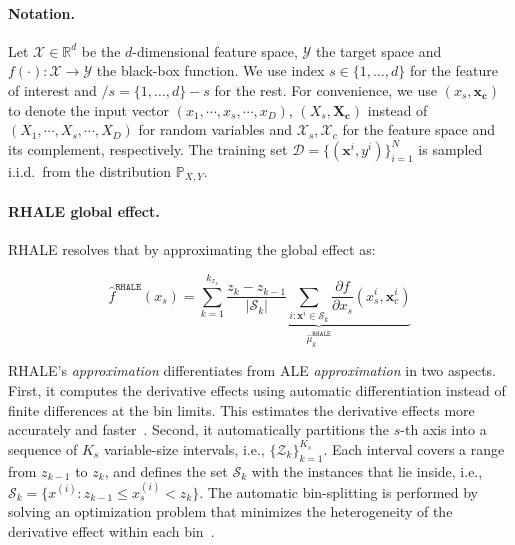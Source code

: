 \documentclass[
twocolumn,
]{ceurart}
\newcommand{\xb}{\mathbf{x}}
\newcommand{\xc}{\mathbf{x_c}}
\newcommand{\Xc}{\mathbf{X_c}}
\newcommand{\xci}{\mathbf{x}^i_c}
\begin{document}
\paragraph{Notation.}

Let \(\mathcal{X} \in \mathbb{R}^d\) be the \(d\)-dimensional feature space, \(\mathcal{Y}\) the target space and
\(f(\cdot) : \mathcal{X} \rightarrow \mathcal{Y}\) the black-box function.
We use index \(s \in \{1, \ldots, d\}\) for the feature of interest and \(/s = \{1, \ldots, d\} - s\) for the rest.
For convenience, we use \((x_s, \xc)\) to denote the input vector \((x_1, \cdots , x_s, \cdots, x_D)\),
\((X_s, \Xc)\) instead of \((X_1, \cdots , X_s, \cdots, X_D)\) for random variables and
$\mathcal{X}_s, \mathcal{X}_{c}$ for the feature space and its complement, respectively.
The training set \(\mathcal{D} = \{(\xb^i, y^i)\}_{i=1}^N\) is sampled
i.i.d.\ from the distribution \(\mathbb{P}_{X,Y}\).

\paragraph{RHALE global effect.}

RHALE resolves that by approximating the global effect as:

\begin{equation}
  \label{eq:rhale-approximation}
\hat{f}^{\mathtt{RHALE}}(x_s) = \sum_{k=1}^{k_{x_s}} \underbrace{\frac{z_k - z_{k-1}}{ \left | \mathcal{S}_k \right |} \sum_{i: \xb^i \in \mathcal{S}_k} \frac{\partial f}{\partial x_s} (x_s^i, \xci)}_{\hat{\mu}_k^{\mathtt{RHALE}}}
\end{equation}

\noindent
RHALE's \textit{approximation} differentiates from ALE \textit{approximation} in two aspects. First, it computes the derivative effects using automatic differentiation instead of finite differences at the bin limits. This estimates the derivative effects more accurately and faster~\citep{gkolemis22a, gkolemis2023regionally}. Second, it automatically partitions the $s$-th axis into a sequence of $K_s$ variable-size intervals, i.e., $\{\mathcal{Z}_k\}_{k=1}^{K_s}$. Each interval covers a range from $z_{k-1}$ to $z_k$, and defines the set $\mathcal{S}_k$ with the instances that lie inside, i.e., $\mathcal{S}_k = \{ x^{(i)} : z_{k-1} \leq x^{(i)}_s < z_k \}$. The automatic bin-splitting is performed by solving an optimization problem that minimizes the heterogeneity of the derivative effect within each bin~\citep{gkolemis2023rhale}.
\end{document}
